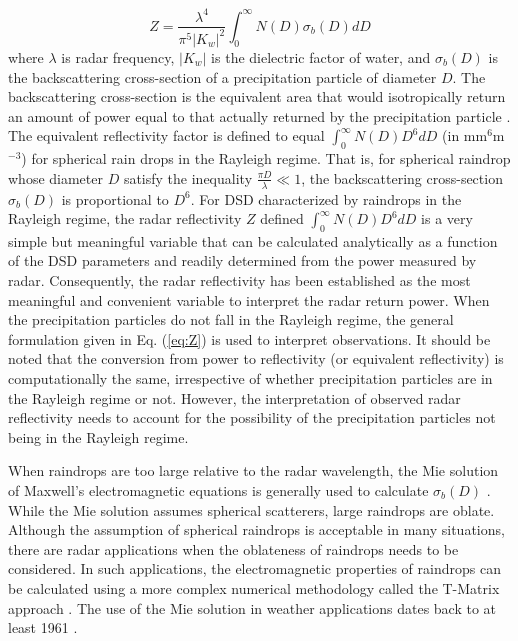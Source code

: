 \documentclass[10pt]{ietbook}
\begin{document}
\begin{equation} \label{eq:Z}
Z=\frac {\lambda ^4} {\pi ^5 |K_w|^2} \int_0^{\infty} N(D) \sigma _b(D) dD
\end{equation}
where $\lambda$ is radar frequency, $|K_w|$ is the dielectric factor of water, and $\sigma _b(D)$ is the 
backscattering cross-section of a precipitation particle of diameter $D$.  The backscattering cross-section is the equivalent area that
would isotropically return an amount of power equal to that actually returned by the precipitation particle \cite{battan1973}.  
The equivalent reflectivity factor is defined to equal $\int_0^{\infty} N(D) D^6 dD$ (in mm${^6}$m$^{-3}$) for spherical rain drops
in the Rayleigh regime.  That is, for spherical raindrop whose diameter $D$ satisfy the inequality $\frac {\pi D} {\lambda} \ll 1$, the
backscattering cross-section $\sigma_b(D)$ is proportional to $D^6$.  For DSD characterized by raindrops in the Rayleigh regime, 
the radar reflectivity $Z$ defined $\int _0 ^{\infty} N(D) D^6 dD$ is a very simple but meaningful variable that can be calculated analytically
as a function of the DSD parameters and readily determined from the power measured by radar. Consequently, the radar reflectivity has
been established as the most meaningful and convenient variable to interpret the radar return power.  When the precipitation particles
do not fall in the Rayleigh regime, the general formulation given in Eq. (\ref{eq:Z}) is used to interpret observations.  It should be noted
that the conversion from
power to reflectivity (or equivalent reflectivity) is computationally the same, irrespective of whether precipitation particles are
in the Rayleigh regime or not.  However, the interpretation of observed radar reflectivity needs to account for the possibility of
the precipitation particles not being in the Rayleigh regime.

When raindrops are too large relative to the radar wavelength, the Mie solution of Maxwell's electromagnetic equations is generally used
to calculate $\sigma _b(D)$ \cite{bhmie2008}.  While the Mie solution assumes spherical scatterers, large raindrops are oblate.  
Although the assumption of spherical raindrops is acceptable in many situations, there are radar applications when the oblateness of 
raindrops needs to be considered.  In such applications, the electromagnetic properties of raindrops can be calculated using a 
more complex numerical methodology called the T-Matrix approach \cite{misch2002}. The use of the Mie solution in weather applications
dates back to at least 1961 \cite{battan1973}.
\end{document}
